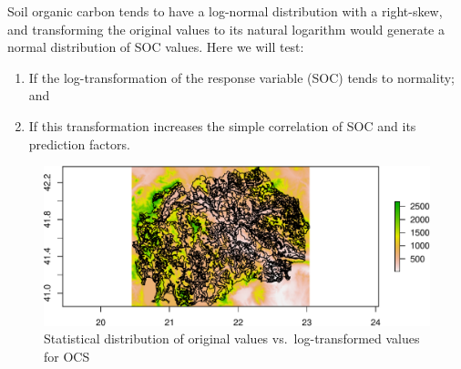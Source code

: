 \documentclass[10pt,b5paper,]{book}
\newenvironment{Shaded}{\begin{snugshade}}{\end{snugshade}}
\newcommand{\CommentTok}[1]{\textcolor[rgb]{0.56,0.35,0.01}{\textit{#1}}}
\newcommand{\DataTypeTok}[1]{\textcolor[rgb]{0.13,0.29,0.53}{#1}}
\newcommand{\DecValTok}[1]{\textcolor[rgb]{0.00,0.00,0.81}{#1}}
\newcommand{\KeywordTok}[1]{\textcolor[rgb]{0.13,0.29,0.53}{\textbf{#1}}}
\newcommand{\NormalTok}[1]{#1}
\newcommand{\OperatorTok}[1]{\textcolor[rgb]{0.81,0.36,0.00}{\textbf{#1}}}
\newcommand{\StringTok}[1]{\textcolor[rgb]{0.31,0.60,0.02}{#1}}
\providecommand{\tightlist}{%
  \setlength{\itemsep}{0pt}\setlength{\parskip}{0pt}}
\theoremstyle{definition}
\theoremstyle{definition}
\theoremstyle{definition}
\theoremstyle{remark}
\begin{document}
Soil organic carbon tends to have a log-normal distribution with a
right-skew, and transforming the original values to its natural
logarithm would generate a normal distribution of SOC values. Here we
will test:

\begin{enumerate}
\def\labelenumi{\arabic{enumi}.}
\tightlist
\item
  If the log-transformation of the response variable (SOC) tends to
  normality; and
\item
  If this transformation increases the simple correlation of SOC and its
  prediction factors.
\end{enumerate}

\begin{Shaded}
\end{Shaded}

\begin{figure}
\centering
\includegraphics{SOCMapping_files/figure-latex/unnamed-chunk-19-1.pdf}
\caption{\label{fig:unnamed-chunk-19}Statistical distribution of original
values vs.~log-transformed values for OCS}
\end{figure}
\end{document}
